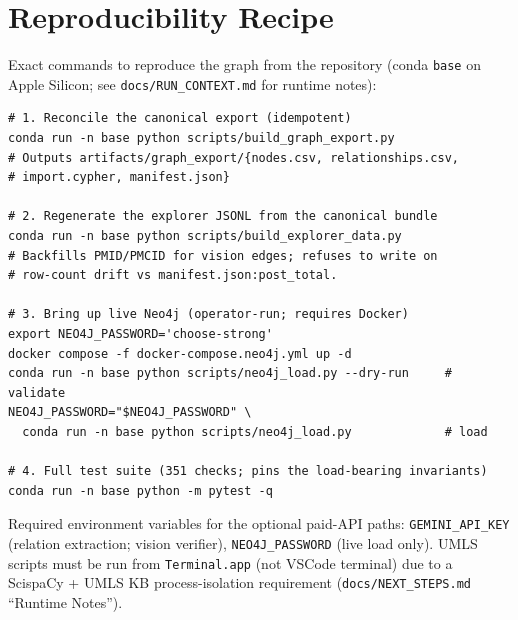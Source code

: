 \documentclass[10pt,twocolumn,letterpaper]{article}
\begin{document}
\section{Reproducibility Recipe}
\label{app:repro}

Exact commands to reproduce the graph from the repository (conda
\texttt{base} on Apple Silicon; see \texttt{docs/RUN\_CONTEXT.md} for
runtime notes):

\begin{verbatim}
# 1. Reconcile the canonical export (idempotent)
conda run -n base python scripts/build_graph_export.py
# Outputs artifacts/graph_export/{nodes.csv, relationships.csv,
# import.cypher, manifest.json}

# 2. Regenerate the explorer JSONL from the canonical bundle
conda run -n base python scripts/build_explorer_data.py
# Backfills PMID/PMCID for vision edges; refuses to write on
# row-count drift vs manifest.json:post_total.

# 3. Bring up live Neo4j (operator-run; requires Docker)
export NEO4J_PASSWORD='choose-strong'
docker compose -f docker-compose.neo4j.yml up -d
conda run -n base python scripts/neo4j_load.py --dry-run     # validate
NEO4J_PASSWORD="$NEO4J_PASSWORD" \
  conda run -n base python scripts/neo4j_load.py             # load

# 4. Full test suite (351 checks; pins the load-bearing invariants)
conda run -n base python -m pytest -q
\end{verbatim}

Required environment variables for the optional paid-API paths:
\texttt{GEMINI\_API\_KEY} (relation extraction; vision verifier),
\texttt{NEO4J\_PASSWORD} (live load only). UMLS scripts must be run from
\texttt{Terminal.app} (not VSCode terminal) due to a ScispaCy + UMLS KB
process-isolation requirement (\texttt{docs/NEXT\_STEPS.md} ``Runtime
Notes'').
\end{document}
